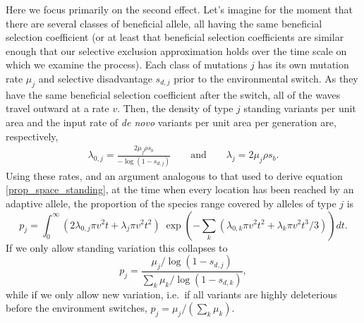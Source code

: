 \documentclass{article}
\begin{document}
Here we focus primarily on the second effect. 
Let's imagine for the moment that there are several classes of beneficial allele,
all having the same beneficial selection coefficient 
(or at least that beneficial selection coefficients are similar enough that our selective exclusion
approximation holds over the time scale on which we examine the process).
Each class of mutations $j$ has its own mutation rate $\mu_j$ and selective disadvantage $s_{d,j}$ prior to the environmental switch. 
As they have the same beneficial selection coefficient after the switch, 
all of the waves travel outward at a rate $v$. 
Then, the density of type $j$ standing variants per unit area 
and the input rate of \textit{de novo} variants per unit area per generation are, respectively,
\begin{align}
  \lambda_{0,j} = \frac{ 2 \mu_j \rho s_b }{ -\log(1-s_{d,j}) } \qquad \text{and} \qquad    \lambda_{j} = 2 \mu_j \rho s_b .
\end{align}
Using these rates, and an argument analogous to that used to derive
equation \eqref{prop_space_standing},
at the time when every location has been reached by an adaptive allele,
the proportion of the species range covered by alleles of type $j$ is
\begin{equation} \label{eqn-prop-space-allele-j}
    p_j = \int_0^\infty  \left( 2 \lambda_{0,j} \pi v^2 t +  \lambda_j \pi v^2 t^2 \right)  
    \; \exp \left( - \sum_k ( \lambda_{0,k} \pi v^2 t^2 + \lambda_k
      \pi v^2 t^3 / 3 ) \right) dt .  %
\end{equation}
If we only allow standing variation this collapses to 
\begin{equation}  \label{eqn-prop-space-allele-j-standing-room-only}
    p_j = \frac{  \mu_j / \log(1-s_{d,j}) }{\sum_k  \mu_k / \log(1-s_{d,k}) } ,
\end{equation}
while if we only allow new variation, 
i.e.\ if all variants are highly deleterious before the environment switches, 
 $p_j =\mu_j / (\sum_k  \mu_k)$.
\end{document}
